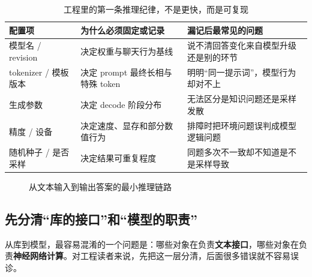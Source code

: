 \begin{table}[H]
\centering
\small
\begin{tabularx}{\textwidth}{>{\raggedright\arraybackslash}p{3cm}>{\raggedright\arraybackslash}p{3.2cm}>{\raggedright\arraybackslash}X}
\toprule
\textbf{配置项} & \textbf{为什么必须固定或记录} & \textbf{漏记后最常见的问题} \\
\midrule
模型名 / revision & 决定权重与聊天行为基线 & 说不清回答变化来自模型升级还是别的环节 \\
tokenizer / 模板版本 & 决定 prompt 最终长相与特殊 token & 明明“同一提示词”，模型行为却对不上 \\
生成参数 & 决定 decode 阶段分布 & 无法区分是知识问题还是采样发散 \\
精度 / 设备 & 决定速度、显存和部分数值行为 & 排障时把环境问题误判成模型逻辑问题 \\
随机种子 / 是否采样 & 决定结果可重复程度 & 同题多次不一致却不知道是不是采样导致 \\
\bottomrule
\end{tabularx}
\caption{工程里的第一条推理纪律，不是更快，而是可复现}
\label{tab:reproducibility-config}
\end{table}

\begin{figure}[H]
\centering
{}
\caption{从文本输入到输出答案的最小推理链路}
\label{fig:inference-pipeline}
\end{figure}

\subsection{先分清“库的接口”和“模型的职责”}
从库到模型，最容易混淆的一个问题是：哪些对象在负责\textbf{文本接口}，哪些对象在负责\textbf{神经网络计算}。对工程读者来说，先把这一层分清，后面很多错误就不容易误诊。

